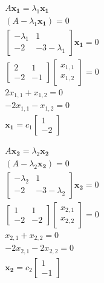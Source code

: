 \documentclass[12pt]{article}
\begin{document}
\begin{minipage}[t]{0.5\textwidth}
\begin{gather*}
A\mathbf{x_1} = \lambda_1\mathbf{x_1} \\
(A - \lambda_1\mathbf{x_1}) = 0 \\
\begin{bmatrix} -\lambda_1 & 1 \\ -2 & -3-\lambda_1 \end{bmatrix}\mathbf{x_1} = 0 \\
\begin{bmatrix} 2 & 1 \\ -2 & -1 \end{bmatrix}\begin{bmatrix} x_{1,1} \\ x_{1,2}\end{bmatrix} = 0 \\
2x_{1,1} + x_{1,2} = 0 \\
-2x_{1,1} - x_{1,2} = 0 \\
\mathbf{x_1} = c_1\begin{bmatrix} 1 \\ -2 \end{bmatrix}
\end{gather*}
\end{minipage}
\vline
\begin{minipage}[t]{0.5\textwidth}
\begin{gather*}
A\mathbf{x_2} = \lambda_2\mathbf{x_2} \\
(A - \lambda_2\mathbf{x_2}) = 0 \\
\begin{bmatrix} -\lambda_2 & 1 \\ -2 & -3-\lambda_2 \end{bmatrix}\mathbf{x_2} = 0 \\
\begin{bmatrix} 1 & 1 \\ -2 & -2 \end{bmatrix}\begin{bmatrix} x_{2,1} \\ x_{2,2}\end{bmatrix} = 0 \\
x_{2,1} + x_{2,2} = 0 \\
-2x_{2,1} - 2x_{2,2} = 0 \\
\mathbf{x_2} = c_2\begin{bmatrix} 1 \\ -1 \end{bmatrix}
\end{gather*}
\end{minipage}
\end{document}
